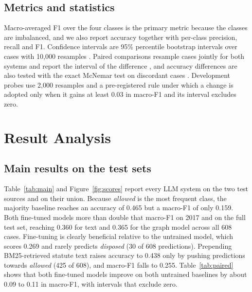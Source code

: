 \documentclass[11pt,a4paper]{article}
\newcommand{\cls}[1]{\emph{#1}}
\begin{document}
\subsection{Metrics and statistics}
Macro-averaged F1 over the four classes is the primary metric because the classes are imbalanced, and we also report accuracy together with per-class precision, recall and F1. Confidence intervals are 95\% percentile bootstrap intervals over cases with 10,000 resamples \cite{r34}. Paired comparisons resample cases jointly for both systems and report the interval of the difference \cite{r28}, and accuracy differences are also tested with the exact McNemar test on discordant cases \cite{r35}. Development probes use 2,000 resamples and a pre-registered rule under which a change is adopted only when it gains at least 0.03 in macro-F1 and its interval excludes zero.

\section{Result Analysis}\label{sec:results}
\subsection{Main results on the test sets}
Table~\ref{tab:main} and Figure~\ref{fig:scores} report every LLM system on the two test sources and on their union. Because \cls{allowed} is the most frequent class, the majority baseline reaches an accuracy of 0.465 but a macro-F1 of only 0.159. Both fine-tuned models more than double that macro-F1 on 2017 and on the full test set, reaching 0.360 for text and 0.365 for the graph model across all 608 cases. Fine-tuning is clearly beneficial relative to the untrained model, which scores 0.269 and rarely predicts \cls{disposed} (30 of 608 predictions). Prepending BM25-retrieved statute text raises accuracy to 0.438 only by pushing predictions towards \cls{allowed} (425 of 608), and macro-F1 falls to 0.255. Table~\ref{tab:paired} shows that both fine-tuned models improve on both untrained baselines by about 0.09 to 0.11 in macro-F1, with intervals that exclude zero.
\end{document}
